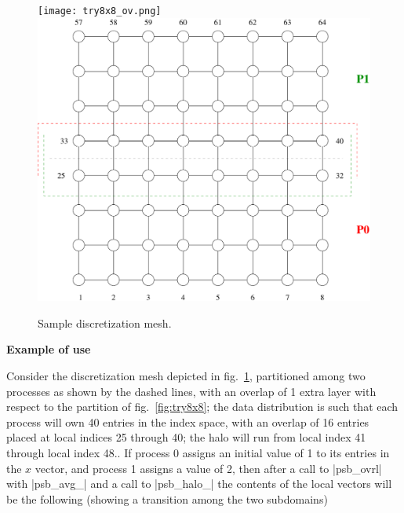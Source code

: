 \begin{figure}[h] 
\begin{center}
\ifcase\pdfoutput
\texttt{[image: try8x8\_ov.png]}
\or
{\includegraphics[scale=0.65]{figures/try8x8_ov}}
\fi
\end{center}
\caption{Sample discretization mesh.\label{fig:try8x8_ov}}
\end{figure}
{\par\noindent\large\bfseries Example of use}
Consider the discretization mesh depicted in fig.~\ref{fig:try8x8_ov},
partitioned among two processes as shown by the dashed lines, with an
overlap of 1 extra layer with respect to the partition of
fig.~\ref{fig:try8x8}; the data 
distribution is such that each process will own 40 entries in the
index space, with an overlap of 16  entries placed at local indices 25 
through 40; the halo will run from local index 41 through local index 48.. If process 0 assigns an initial value of 1 to its entries
in the $x$ vector, and process 1 assigns a value of 2, then after a
call to \fortinline|psb_ovrl| with \fortinline|psb_avg_| and a call to
\fortinline|psb_halo_| the contents of the local vectors will be the
following (showing a transition among the two subdomains)  

